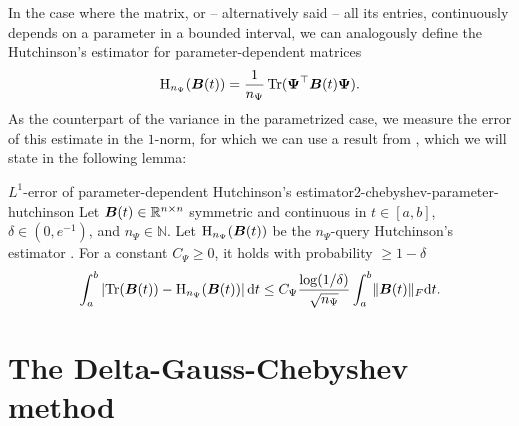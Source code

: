 In the case where the matrix, or -- alternatively said -- all its entries, continuously depends on a
parameter in a bounded interval, we can analogously define the Hutchinson's
estimator for parameter-dependent matrices
\begin{equation}
    \operatorname{H}_{n_{\Psi}}(\boldsymbol{B}(t)) = \frac{1}{n_{\Psi}} \operatorname{Tr}(\boldsymbol{\Psi}^{\top} \boldsymbol{B}(t) \boldsymbol{\Psi}).
    \label{equ:2-chebyshev-DGC-hutchionson-estimator-parameter}
\end{equation}
As the counterpart of the variance in the parametrized case, we measure the
error of this estimate in the $1$-norm, for which we can use a result
from \cite{he2023parameter}, which we will state in the following lemma:
\begin{lemma}{$L^1$-error of parameter-dependent Hutchinson's estimator}{2-chebyshev-parameter-hutchinson}
    Let $\boldsymbol{B}(t) \in \mathbb{R}^{n \times n}$ symmetric and continuous in
    $t \in [a, b]$, $\delta \in (0, e^{-1})$, and $n_{\Psi} \in \mathbb{N}$.
    Let $\operatorname{H}_{n_{\Psi}}(\boldsymbol{B}(t))$ be the $n_{\Psi}$-query
    Hutchinson's estimator .
    For a constant $C_{\Psi} \geq 0$, it holds with probability $\geq 1 - \delta$
    \begin{equation}
        \int_{a}^{b} \left| \operatorname{Tr}(\boldsymbol{B}(t)) - \operatorname{H}_{n_{\Psi}}(\boldsymbol{B}(t)) \right| \mathrm{d}t \leq C_{\Psi} \frac{\log(1/\delta)}{\sqrt{n_{\Psi}}} \int_{a}^{b} \lVert \boldsymbol{B}(t) \rVert _F \mathrm{d}t.
    \end{equation}
\end{lemma}


\section{The Delta-Gauss-Chebyshev method}
\label{sec:2-chebyshev-delta-gauss-chebyshev}

